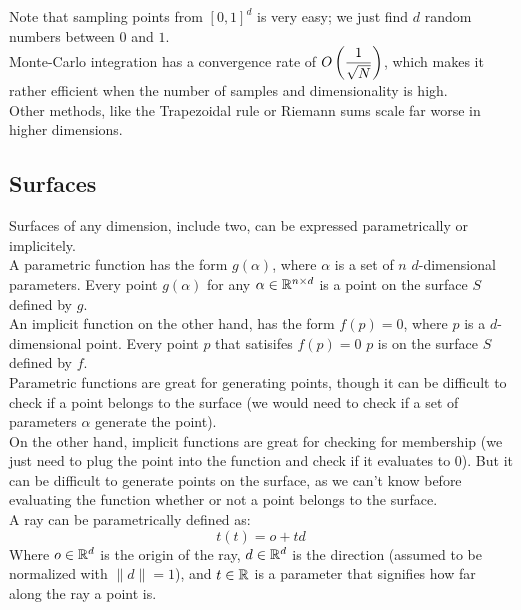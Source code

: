 \documentclass[12pt]{article}
\begin{document}
Note that sampling points from $[0, 1]^d$
is very easy; we just find $d$ random numbers
between $0$ and $1$. \\

Monte-Carlo integration has a convergence rate
of $O\left( \dfrac{1}{\sqrt{N}} \right)$, which makes it
rather efficient when the number of samples
and dimensionality is high. \\
Other methods, like the Trapezoidal rule or Riemann
sums scale far worse in higher dimensions. \\

\newpage

\subsection*{Surfaces}

Surfaces of any dimension, include two,
can be expressed parametrically or implicitely. \\

A parametric function has the form $g(\alpha)$,
where $\alpha$ is a set of $n$ $d$-dimensional 
parameters. Every point $g(\alpha)$ for any 
$\alpha \in \mathbb{R}^{n \times d}$ is a point on the
surface $S$ defined by $g$. \\

An implicit function on the other hand,
has the form $f(p) = 0$,
where $p$ is a $d$-dimensional point. 
Every point $p$ that satisifes 
$f(p) = 0$ $p$ is on the surface $S$ defined by $f$. \\

Parametric functions are great for generating
points, though it can be difficult to check 
if a point belongs to the surface 
(we would need to check if a set of
parameters $\alpha$ generate the point). \\

On the other hand, implicit functions are great
for checking for membership (we just need to
plug the point into the function and check
if it evaluates to $0$). But it can be difficult
to generate points on the surface, as we
can't know before evaluating the function
whether or not a point belongs to the surface. \\

A ray can be parametrically defined as:
\[ t(t) = o + td \]
Where $o \in \mathbb{R}^d$ is the origin of the ray,
$d \in \mathbb{R}^d$ is the direction (assumed to be
normalized with $\|d\| = 1$), and $t \in \mathbb{R}$
is a parameter that signifies how far along
the ray a point is. \\
\end{document}
